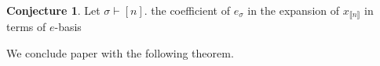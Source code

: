 \documentclass[12pt]{amsart}  %
\theoremstyle{definition}
\newtheorem{conjecture}[theorem]{Conjecture}
\theoremstyle{remark}
\numberwithin{equation}{section}
\newcommand{\NCSym}{\ensuremath{\operatorname{NCSym}}}
\newcommand{\xnc}{{x}}                 %
\newcommand{\stn}{{\llbracket n \rrbracket}}
\newcommand{\mymu}{{u}}
\newcommand\svw[1]{{\color{black}{#1}}}
\begin{document}
%
%
%


\begin{conjecture}\label{conj}
Let $\sigma\vdash [n]$. \svw{Then} the coefficient of $e_\sigma$ in the expansion of $x_\stn$ in terms of \svw{the} $e$-basis \svw{is positive if $n-1$ is even, and negative if $n-1$ is odd.} \end{conjecture}



We conclude \svw{our} paper with the following theorem. 
\end{document}

